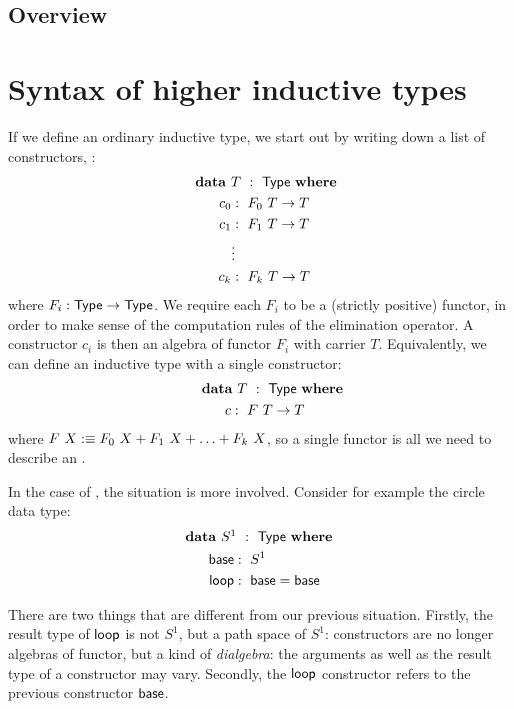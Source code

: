 \documentclass[a4paper,10pt]{article}
\begin{document}
\subsection{Overview}
\label{sec:overview}


\section{Syntax of higher inductive types}
\label{sec:syntax}

If we define an ordinary inductive type, we start out by writing down
a list of constructors, \eg:
%
\begin{alignat*}{2}
  &\rlap{$\data\ T\ :\ \Type\ \where$} \\
  &&\ \ c_0  &:\ F_0\ T \to T \\
  &&\ \ c_1  &:\ F_1\ T \to T \\
  &&\ \      &\vdots \\
  &&\ \ c_k  &:\ F_k\ T \to T
\end{alignat*}
%
where $F_i : \mathsf{Type} \to \mathsf{Type}$. We require each $F_i$ to be a (strictly
positive) functor, in order to make sense of the computation rules of
the elimination operator. A constructor $c_i$ is then an algebra of
functor $F_i$ with carrier $T$. Equivalently, we can define an
inductive type with a single constructor:
%
\begin{alignat*}{2}
  &\rlap{$\data\ T\ :\ \Type\ \where$} \\
  &&\ \ c &:\ F\ T \to T 
\end{alignat*}
%
where $F\ X :\equiv F_0\ X + F_1\ X + \hdots + F_k\ X$, so a single
functor is all we need to describe an \oit.

In the case of \hits, the situation is more involved. Consider for
example the circle data type:
%
\begin{alignat*}{2}
  &\rlap{$\data\ S^1\ :\ \Type\ \where$} \\
  &&\ \ \base     &:\ S^1 \\
  &&\ \ \loopcstr &:\ \base = \base
\end{alignat*}

There are two things that are different from our previous
situation. Firstly, the result type of $\mathsf{loop}$ is not $S^1$, but a path
space of $S^1$: constructors are no longer algebras of functor, but a
kind of \emph{dialgebra}: the arguments as well as the result type of
a constructor may vary. Secondly, the $\mathsf{loop}$ constructor refers to the
previous constructor $\mathsf{base}$.
\end{document}
